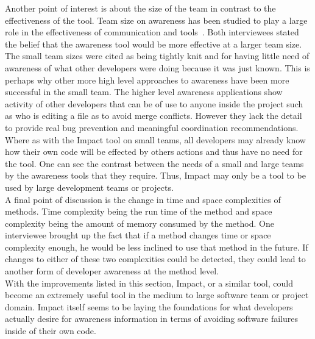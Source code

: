 \documentclass[conference]{IEEEtran}
\begin{document}
Another point of interest is about the size of the team in contrast to the effectiveness
of the tool. Team size on awareness has been studied to play a large role in the effectiveness
of communication and tools~\cite{Bradner:2003:ETS}. Both interviewees stated the belief that the awareness tool would be more
effective at a larger team size. The small team sizes were cited as being tightly knit and
for having little need of awareness of what other developers were doing because it
was just known. This is perhaps why other more high level approaches to awareness have
been more successful in the small team. The higher level awareness applications 
show activity of other developers that can be of use to anyone inside the project such 
as who is editing a file as to avoid merge conflicts. However they lack the detail to
provide real bug prevention and meaningful coordination recommendations. Where as
with the Impact tool on small teams, all developers may already know how their own code
will be effected by others actions and thus have no need for the tool. One can see the
contrast between the needs of a small and large teams by the awareness tools that they
require. Thus, Impact may only be a tool to be used by large development teams or
projects.\\

A final point of discussion is the change in time and space complexities of methods.
Time complexity being the run time of the method and space complexity being
the amount of memory consumed by the method.
One interviewee brought up the fact that if a method changes time or space
complexity enough, he would be less inclined to use that method in the future.
If changes to either of these two complexities could be detected, they could lead
to another form of developer awareness at the method level.\\

With the improvements listed in this section, Impact, or a similar tool, could become
an extremely useful tool in the medium to large software team or project
domain. Impact itself seems to be laying the foundations for what developers
actually desire for awareness information in terms of avoiding software failures
inside of their own code.\\
\end{document}
